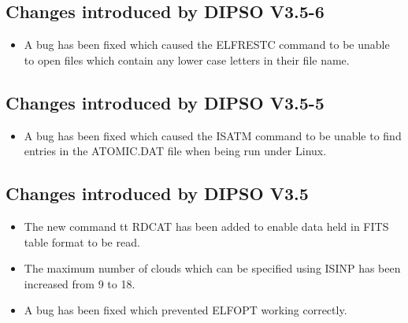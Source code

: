 \documentclass[twoside,11pt]{article}
\renewcommand{\_}{\texttt{\symbol{95}}}
\begin{document}
\subsection{Changes introduced by DIPSO V3.5-6}
\begin{itemize}
\item A bug has been fixed which caused the ELFRESTC command to be unable to
open files which contain any lower case letters in their file name.
\end{itemize}

\subsection{Changes introduced by DIPSO V3.5-5}
\begin{itemize}
\item A bug has been fixed which caused the ISATM command to be unable to
find entries in the ATOMIC.DAT file when being run under Linux.
\end{itemize}

\subsection{Changes introduced by DIPSO V3.5}
\begin{itemize}
\item The new command {tt RDCAT} has been added to enable data held in FITS 
table format to be read.
\item The maximum number of clouds which can be specified using ISINP has
been increased from 9 to 18.
\item A bug has been fixed which prevented ELFOPT working correctly.
\end{itemize}
\end{document}
